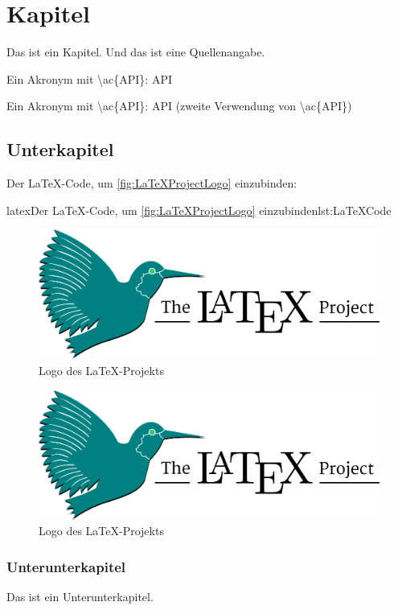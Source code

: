 

\chapter{Kapitel}
Das ist ein Kapitel.
Und das ist eine Quellenangabe\cite{MadeInGermanyLabel}.

Ein Akronym mit \textbackslash ac\{API\}: \ac{API}

Ein Akronym mit \textbackslash ac\{API\}: \ac{API} (zweite Verwendung von \textbackslash ac\{API\})


\section{Unterkapitel}
Der \LaTeX-Code, um \autoref{fig:LaTeXProjectLogo} einzubinden:

\begin{code}{latex}{Der \LaTeX-Code, um \autoref{fig:LaTeXProjectLogo} einzubinden}{lst:LaTeXCode}
    \begin{figure}[ht]
        \centering
        \includegraphics[width=0.5\linewidth]{images/LaTeX_project_logo_bird}
        \caption{Logo des \LaTeX-Projekts}
        \label{fig:LaTeXProjectLogo}
    \end{figure}
\end{code}
\definecolor{LinkColor}{HTML}{\linkColor}  %


\begin{figure}[ht]
    \centering
    \includegraphics[width=0.5\linewidth]{images/LaTeX_project_logo_bird}
    \caption{Logo des \LaTeX-Projekts}
    \label{fig:LaTeXProjectLogo}
\end{figure}

\subsection{Unterunterkapitel}
Das ist ein Unterunterkapitel.
